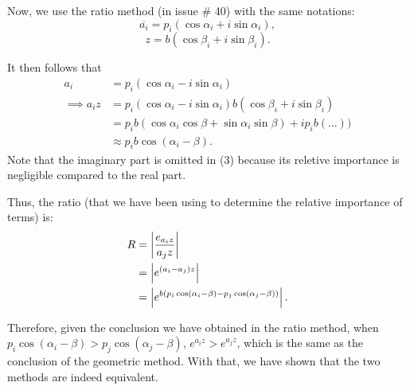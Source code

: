 \documentclass[11pt,reqno,oneside,a4paper]{article}
\begin{document}
Now, we use the ratio method (in issue \# 40) with the same notations:
$$\overline{a_i} = p_i (\cos\alpha_i + i\sin\alpha_i),$$
$$z = b (\cos\beta_i + i\sin\beta_i).$$

It then follows that
\begin{align}
a_i &= p_i (\cos\alpha_i - i\sin\alpha_i)\\
\implies a_i z &= p_i (\cos\alpha_i - i\sin\alpha_i)b (\cos\beta_i + i\sin\beta_i) \\
&=p_i b (\cos\alpha_i\cos\beta + \sin\alpha_i\sin\beta) + i p_i b(\dots))\\
&\approx p_i b \cos(\alpha_i -\beta).
\end{align}
Note that the imaginary part is omitted in (3) because its reletive importance is negligible compared to the real part. 

Thus, the ratio (that we have been using to determine the relative importance of terms) is:
\begin{align*}
	R &= \left\lvert\frac{e_{a_i z}}{a_j z}\right\rvert\\
	&= \left\lvert e^{(a_i-a_j)z}\right\rvert\\
	&= \left\lvert e^{b(p_i\cos(\alpha_i-\beta)-p_j\cos(\alpha_j-\beta))}\right\rvert.
\end{align*}

Therefore, given the conclusion we have obtained in the ratio method, when $p_i\cos(\alpha_i-\beta)>p_j\cos(\alpha_j-\beta)$, $e^{a_iz}>e^{a_jz}$, which is the same as the conclusion of the geometric method. With that, we have shown that the two methods are indeed equivalent. 
\end{document}
